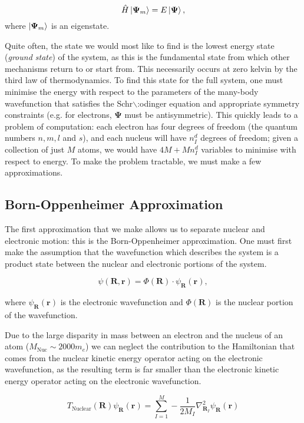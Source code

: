 \documentclass[11pt]{article}
\begin{document}
\[ \hat{H}\ket{\mathbf{\Psi}_m} = E \ket{\mathbf{\Psi}}, \]
where \(\ket{\mathbf{\Psi}_m}\) is an eigenstate.

Quite often, the state we would most like to find is the lowest energy state (\emph{ground state})
of the system, as this is the fundamental state from which other mechanisms return to or start
from. This necessarily occurs at zero kelvin by the third law of thermodynamics. To find this
state for the full system, one must minimise the energy with respect to the parameters of the
many-body wavefunction that satisfies the Schr$\backslash$:odinger equation and appropriate symmetry
constraints (e.g. for electrons, \(\mathbf{\Psi}\) must be antisymmetric). This quickly leads to
a problem of computation: each electron has four degrees of freedom (the quantum numbers \(n, m,
l\) and \(s\)), and each nucleus will have \(n^d_I\) degrees of freedom; given a collection of
just \(M\) atoms, we would have \(4M + Mn^d_I\) variables to minimise with respect to energy. To
make the problem tractable, we must make a few approximations.

\subsection{Born-Oppenheimer Approximation}
\label{sec:orge2bd6f0}

The first approximation that we make allows us to separate nuclear and electronic motion: this is the
Born-Oppenheimer approximation. One must first make the assumption that the
wavefunction which describes the system is a product state between the nuclear and electronic
portions of the system.

\[ \psi(\mathbf{R}, \mathbf{r}) = \Phi(\mathbf{R}) \cdot \psi_{\mathbf{R}}(\mathbf{r}), \]

where \(\psi_{\mathbf{R}}(\mathbf{r})\) is the electronic wavefunction and \(\Phi(\mathbf{R})\) is
the nuclear portion of the wavefunction.

Due to the large disparity in mass between an electron and the nucleus of an atom (\(M_\text{Nuc} \sim
2000 m_e\)) we can neglect the contribution to the Hamiltonian that comes from the nuclear
kinetic energy operator acting on the electronic wavefunction, as the resulting term is far
smaller than the electronic kinetic energy operator acting on the electronic wavefunction.

\[T_{\text{Nuclear}}(\mathbf{R}) \psi_{\mathbf{R}}(\mathbf{r}) = \sum_{I =
1}^{M} - \frac{1}{2M_{I}} \nabla^{2}_{\mathbf{R}_{I}} \psi_{\mathbf{R}}(\mathbf{r})\]
\end{document}
